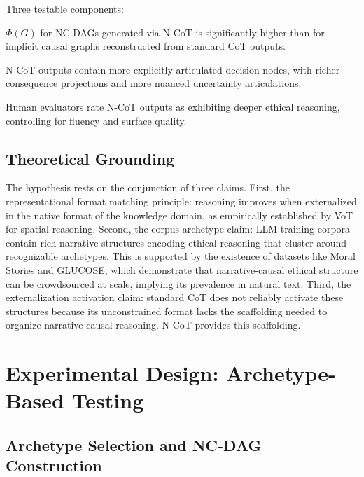 \documentclass[11pt,letterpaper]{article}
\theoremstyle{defn}
\begin{document}
Three testable components:
\begin{description}[leftmargin=2em]
\item[H1 (Structural Alignment):] $\Phi(G)$ for NC-DAGs generated via N-CoT is significantly higher than for implicit causal graphs reconstructed from standard CoT outputs.
\item[H2 (Decision Depth):] N-CoT outputs contain more explicitly articulated decision nodes, with richer consequence projections and more nuanced uncertainty articulations.
\item[H3 (Reasoning Quality):] Human evaluators rate N-CoT outputs as exhibiting deeper ethical reasoning, controlling for fluency and surface quality.
\end{description}

\subsection{Theoretical Grounding}

The hypothesis rests on the conjunction of three claims. First, the representational format matching principle: reasoning improves when externalized in the native format of the knowledge domain, as empirically established by VoT for spatial reasoning. Second, the corpus archetype claim: LLM training corpora contain rich narrative structures encoding ethical reasoning that cluster around recognizable archetypes. This is supported by the existence of datasets like Moral Stories and GLUCOSE, which demonstrate that narrative-causal ethical structure can be crowdsourced at scale, implying its prevalence in natural text. Third, the externalization activation claim: standard CoT does not reliably activate these structures because its unconstrained format lacks the scaffolding needed to organize narrative-causal reasoning. N-CoT provides this scaffolding.

\section{Experimental Design: Archetype-Based Testing}

\subsection{Archetype Selection and NC-DAG Construction}
\end{document}
